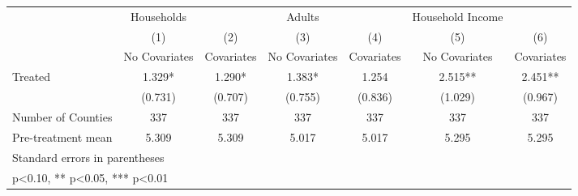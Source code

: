 {
\def\sym#1{\ifmmode^{#1}\else\(^{#1}\)\fi}
\begin{tabular}{l*{6}{c}}
\hline\hline
            &  Households   &               &      Adults   &               &Household Income   &               \\
            &\multicolumn{1}{c}{(1)}&\multicolumn{1}{c}{(2)}&\multicolumn{1}{c}{(3)}&\multicolumn{1}{c}{(4)}&\multicolumn{1}{c}{(5)}&\multicolumn{1}{c}{(6)}\\
            &\multicolumn{1}{c}{No Covariates}&\multicolumn{1}{c}{Covariates}&\multicolumn{1}{c}{No Covariates}&\multicolumn{1}{c}{Covariates}&\multicolumn{1}{c}{No Covariates}&\multicolumn{1}{c}{Covariates}\\
\hline
Treated     &       1.329*  &       1.290*  &       1.383*  &       1.254   &       2.515** &       2.451** \\
            &     (0.731)   &     (0.707)   &     (0.755)   &     (0.836)   &     (1.029)   &     (0.967)   \\
\hline
Number of Counties&         337   &         337   &         337   &         337   &         337   &         337   \\
Pre-treatment mean&       5.309   &       5.309   &       5.017   &       5.017   &       5.295   &       5.295   \\
\hline\hline
\multicolumn{7}{l}{\footnotesize Standard errors in parentheses}\\
\multicolumn{7}{l}{\footnotesize * p<0.10, ** p<0.05, *** p<0.01}\\
\end{tabular}
}
